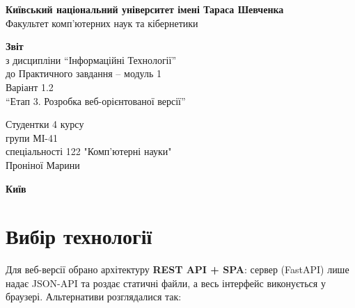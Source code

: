 \documentclass[12pt,a4paper]{article}
\begin{document}
\begin{titlepage}
\centering\large
\textbf{Київський національний університет імені Тараса Шевченка}\\
Факультет комп'ютерних наук та кібернетики

\textbf{Звіт}\\
з дисципліни “Інформаційні Технології”\\
до Практичного завдання -- модуль 1\\
Варіант 1.2\\
“Етап 3. Розробка веб-орієнтованої версії”

\begin{flushright}
Студентки 4 курсу\\
групи МІ-41\\
спеціальності 122 "Комп’ютерні науки"\\
Проніної Марини
\end{flushright}

\textbf{Київ \the\year}
\end{titlepage}

\begin{abstract}
\noindent
Звіт документує \textbf{веб-клієнт} проєкту «Хмарне сховище» (\texttt{web/\allowbreak{}}) --- односторінковий застосунок (SPA) на Vue 3, зібраний Vite, що працює з тим самим REST API на FastAPI, що й десктоп-клієнт. Описано обрану технологію та архітектуру, прецеденти зі скріншотами (включно з операцією варіанта 12, перетягуванням файлів і синхронізацією папки через File System Access API), тестування (14 тестів Vitest) і публічне розгортання (Docker, Render).
\end{abstract}

\tableofcontents
\newpage


\section{Вибір технології}

Для веб-версії обрано архітектуру \textbf{REST API + SPA}: сервер (FastAPI) лише надає JSON-API та роздає статичні файли, а весь інтерфейс виконується у браузері. Альтернативи розглядалися так:
\end{document}
